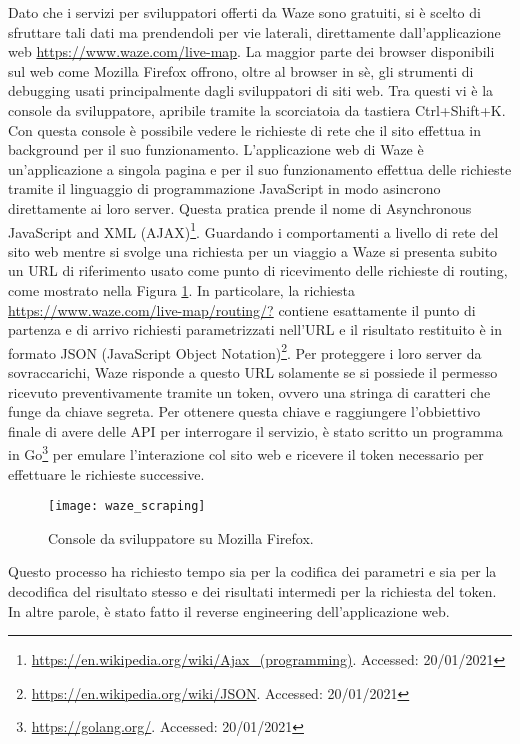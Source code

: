Dato che i servizi per sviluppatori offerti da Waze sono gratuiti, si è scelto di sfruttare tali dati ma prendendoli per vie laterali, direttamente dall'applicazione web \url{https://www.waze.com/live-map}. La maggior parte dei browser disponibili sul web come Mozilla Firefox offrono, oltre al browser in sè, gli strumenti di debugging usati principalmente dagli sviluppatori di siti web. Tra questi vi è la console da sviluppatore, apribile tramite la scorciatoia da tastiera Ctrl+Shift+K. Con questa console è possibile vedere le richieste di rete che il sito effettua in background per il suo funzionamento. L'applicazione web di Waze è un'applicazione a singola pagina e per il suo funzionamento effettua delle richieste tramite il linguaggio di programmazione JavaScript in modo asincrono direttamente ai loro server. Questa pratica prende il nome di Asynchronous JavaScript and XML (AJAX)\footnote{\url{https://en.wikipedia.org/wiki/Ajax_(programming)}. Accessed: 20/01/2021}. Guardando i comportamenti a livello di rete del sito web mentre si svolge una richiesta per un viaggio a Waze si presenta subito un URL di riferimento usato come punto di ricevimento delle richieste di routing, come mostrato nella Figura \ref{image:1}. In particolare, la richiesta \url{https://www.waze.com/live-map/routing/?} contiene esattamente il punto di partenza e di arrivo richiesti parametrizzati nell'URL e il risultato restituito è in formato JSON (JavaScript Object Notation)\footnote{\url{https://en.wikipedia.org/wiki/JSON}. Accessed: 20/01/2021}. Per proteggere i loro server da sovraccarichi, Waze risponde a questo URL solamente se si possiede il permesso ricevuto preventivamente tramite un token, ovvero una stringa di caratteri che funge da chiave segreta. Per ottenere questa chiave e raggiungere l'obbiettivo finale di avere delle API per interrogare il servizio, è stato scritto un programma in Go\footnote{\url{https://golang.org/}. Accessed: 20/01/2021} per emulare l'interazione col sito web e ricevere il token necessario per effettuare le richieste successive. 

\begin{figure}[H]
	\texttt{[image: waze\_scraping]}
	\caption{Console da sviluppatore su Mozilla Firefox.}
	\label{image:1}
\end{figure}

Questo processo ha richiesto tempo sia per la codifica dei parametri e sia per la decodifica del risultato stesso e dei risultati intermedi per la richiesta del token. In altre parole, è stato fatto il reverse engineering dell'applicazione web.


